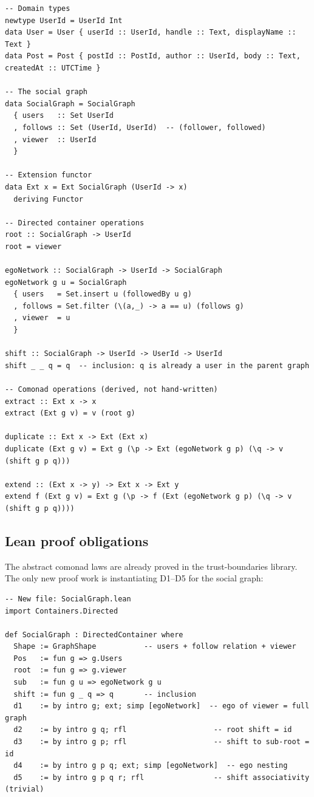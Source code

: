 \documentclass[11pt,a4paper]{article}
\theoremstyle{definition}
\theoremstyle{plain}
\theoremstyle{remark}
\begin{document}
\begin{lstlisting}[style=haskell]
-- Domain types
newtype UserId = UserId Int
data User = User { userId :: UserId, handle :: Text, displayName :: Text }
data Post = Post { postId :: PostId, author :: UserId, body :: Text, createdAt :: UTCTime }

-- The social graph
data SocialGraph = SocialGraph
  { users   :: Set UserId
  , follows :: Set (UserId, UserId)  -- (follower, followed)
  , viewer  :: UserId
  }

-- Extension functor
data Ext x = Ext SocialGraph (UserId -> x)
  deriving Functor

-- Directed container operations
root :: SocialGraph -> UserId
root = viewer

egoNetwork :: SocialGraph -> UserId -> SocialGraph
egoNetwork g u = SocialGraph
  { users   = Set.insert u (followedBy u g)
  , follows = Set.filter (\(a,_) -> a == u) (follows g)
  , viewer  = u
  }

shift :: SocialGraph -> UserId -> UserId -> UserId
shift _ _ q = q  -- inclusion: q is already a user in the parent graph

-- Comonad operations (derived, not hand-written)
extract :: Ext x -> x
extract (Ext g v) = v (root g)

duplicate :: Ext x -> Ext (Ext x)
duplicate (Ext g v) = Ext g (\p -> Ext (egoNetwork g p) (\q -> v (shift g p q)))

extend :: (Ext x -> y) -> Ext x -> Ext y
extend f (Ext g v) = Ext g (\p -> f (Ext (egoNetwork g p) (\q -> v (shift g p q))))
\end{lstlisting}

\subsection{Lean proof obligations}

The abstract comonad laws are already proved in the trust-boundaries
library. The only new proof work is instantiating D1--D5 for the
social graph:

\begin{lstlisting}[style=lean]
-- New file: SocialGraph.lean
import Containers.Directed

def SocialGraph : DirectedContainer where
  Shape := GraphShape           -- users + follow relation + viewer
  Pos   := fun g => g.Users
  root  := fun g => g.viewer
  sub   := fun g u => egoNetwork g u
  shift := fun g _ q => q       -- inclusion
  d1    := by intro g; ext; simp [egoNetwork]  -- ego of viewer = full graph
  d2    := by intro g q; rfl                    -- root shift = id
  d3    := by intro g p; rfl                    -- shift to sub-root = id
  d4    := by intro g p q; ext; simp [egoNetwork]  -- ego nesting
  d5    := by intro g p q r; rfl                -- shift associativity (trivial)
\end{lstlisting}
\end{document}
